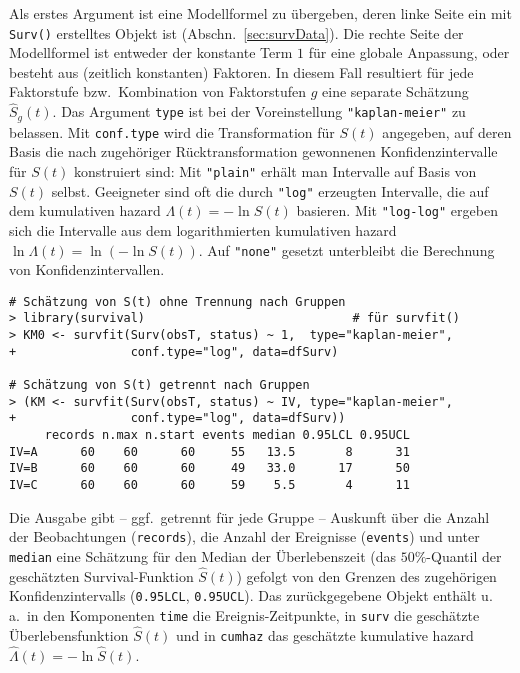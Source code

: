 Als erstes Argument ist eine Modellformel zu übergeben, deren linke Seite ein mit \lstinline!Surv()! erstelltes Objekt ist (Abschn.\ \ref{sec:survData}). Die rechte Seite der Modellformel ist entweder der konstante Term $1$ für eine globale Anpassung, oder besteht aus (zeitlich konstanten) Faktoren. In diesem Fall resultiert für jede Faktorstufe bzw.\ Kombination von Faktorstufen $g$ eine separate Schätzung $\hat{S}_{g}(t)$. Das Argument \lstinline!type! ist bei der Voreinstellung \lstinline!"kaplan-meier"! zu belassen. Mit \lstinline!conf.type! wird die Transformation für $S(t)$ angegeben, auf deren Basis die nach zugehöriger Rücktransformation gewonnenen Konfidenzintervalle für $S(t)$ konstruiert sind: Mit \lstinline!"plain"! erhält man Intervalle auf Basis von $S(t)$ selbst. Geeigneter sind oft die durch \lstinline!"log"! erzeugten Intervalle, die auf dem kumulativen hazard $\Lambda(t) = -\ln S(t)$ basieren. Mit \lstinline!"log-log"! ergeben sich die Intervalle aus dem logarithmierten kumulativen hazard $\ln \Lambda(t) = \ln (-\ln S(t))$. Auf \lstinline!"none"! gesetzt unterbleibt die Berechnung von Konfidenzintervallen.
\begin{lstlisting}
# Schätzung von S(t) ohne Trennung nach Gruppen
> library(survival)                             # für survfit()
> KM0 <- survfit(Surv(obsT, status) ~ 1,  type="kaplan-meier",
+                conf.type="log", data=dfSurv)

# Schätzung von S(t) getrennt nach Gruppen
> (KM <- survfit(Surv(obsT, status) ~ IV, type="kaplan-meier",
+                conf.type="log", data=dfSurv))
     records n.max n.start events median 0.95LCL 0.95UCL
IV=A      60    60      60     55   13.5       8      31
IV=B      60    60      60     49   33.0      17      50
IV=C      60    60      60     59    5.5       4      11
\end{lstlisting}

Die Ausgabe gibt -- ggf.\ getrennt für jede Gruppe -- Auskunft über die Anzahl der Beobachtungen (\lstinline!records!), die Anzahl der Ereignisse (\lstinline!events!) und unter \lstinline!median! eine Schätzung für den Median der Überlebenszeit (das $50 \%$-Quantil der geschätzten Survival-Funktion $\hat{S}(t)$) gefolgt von den Grenzen des zugehörigen Konfidenzintervalls (\lstinline!0.95LCL!, \lstinline!0.95UCL!). Das zurückgegebene Objekt enthält u.\,a.\ in den Komponenten \lstinline!time! die Ereignis-Zeitpunkte, in \lstinline!surv! die geschätzte Überlebensfunktion $\hat{S}(t)$ und in \lstinline!cumhaz! das geschätzte kumulative hazard $\hat{\Lambda}(t) = -\ln \hat{S}(t)$.


